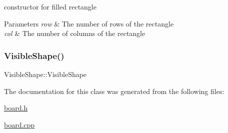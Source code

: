 constructor for filled rectangle 


\begin{DoxyParams}{Parameters}
{\em row} & The number of rows of the rectangle \\
\hline
{\em col} & The number of columns of the rectangle \\
\hline
\end{DoxyParams}
\mbox{\label{class_board_a280deeca2a39d227887ff2e13b009c0a}} 
\subsubsection{\texorpdfstring{Visible\+Shape()}{VisibleShape()}\hspace{0.1cm}{\footnotesize\ttfamily [3/3]}}
{\footnotesize\ttfamily Visible\+Shape\+::\+Visible\+Shape}



The documentation for this class was generated from the following files\+:\begin{DoxyCompactItemize}
\item 
\mbox{\hyperlink{board_8h}{board.\+h}}\item 
\mbox{\hyperlink{board_8cpp}{board.\+cpp}}\end{DoxyCompactItemize}
